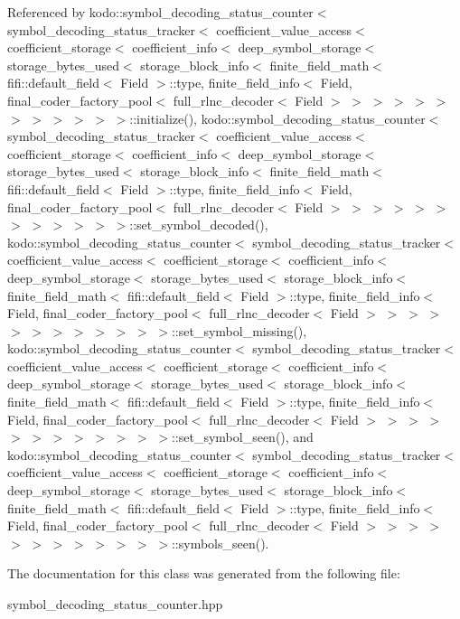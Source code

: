 Referenced by kodo\-::symbol\-\_\-decoding\-\_\-status\-\_\-counter$<$ symbol\-\_\-decoding\-\_\-status\-\_\-tracker$<$ coefficient\-\_\-value\-\_\-access$<$ coefficient\-\_\-storage$<$ coefficient\-\_\-info$<$ deep\-\_\-symbol\-\_\-storage$<$ storage\-\_\-bytes\-\_\-used$<$ storage\-\_\-block\-\_\-info$<$ finite\-\_\-field\-\_\-math$<$ fifi\-::default\-\_\-field$<$ Field $>$\-::type, finite\-\_\-field\-\_\-info$<$ Field, final\-\_\-coder\-\_\-factory\-\_\-pool$<$ full\-\_\-rlnc\-\_\-decoder$<$ Field $>$ $>$ $>$ $>$ $>$ $>$ $>$ $>$ $>$ $>$ $>$ $>$\-::initialize(), kodo\-::symbol\-\_\-decoding\-\_\-status\-\_\-counter$<$ symbol\-\_\-decoding\-\_\-status\-\_\-tracker$<$ coefficient\-\_\-value\-\_\-access$<$ coefficient\-\_\-storage$<$ coefficient\-\_\-info$<$ deep\-\_\-symbol\-\_\-storage$<$ storage\-\_\-bytes\-\_\-used$<$ storage\-\_\-block\-\_\-info$<$ finite\-\_\-field\-\_\-math$<$ fifi\-::default\-\_\-field$<$ Field $>$\-::type, finite\-\_\-field\-\_\-info$<$ Field, final\-\_\-coder\-\_\-factory\-\_\-pool$<$ full\-\_\-rlnc\-\_\-decoder$<$ Field $>$ $>$ $>$ $>$ $>$ $>$ $>$ $>$ $>$ $>$ $>$ $>$\-::set\-\_\-symbol\-\_\-decoded(), kodo\-::symbol\-\_\-decoding\-\_\-status\-\_\-counter$<$ symbol\-\_\-decoding\-\_\-status\-\_\-tracker$<$ coefficient\-\_\-value\-\_\-access$<$ coefficient\-\_\-storage$<$ coefficient\-\_\-info$<$ deep\-\_\-symbol\-\_\-storage$<$ storage\-\_\-bytes\-\_\-used$<$ storage\-\_\-block\-\_\-info$<$ finite\-\_\-field\-\_\-math$<$ fifi\-::default\-\_\-field$<$ Field $>$\-::type, finite\-\_\-field\-\_\-info$<$ Field, final\-\_\-coder\-\_\-factory\-\_\-pool$<$ full\-\_\-rlnc\-\_\-decoder$<$ Field $>$ $>$ $>$ $>$ $>$ $>$ $>$ $>$ $>$ $>$ $>$ $>$\-::set\-\_\-symbol\-\_\-missing(), kodo\-::symbol\-\_\-decoding\-\_\-status\-\_\-counter$<$ symbol\-\_\-decoding\-\_\-status\-\_\-tracker$<$ coefficient\-\_\-value\-\_\-access$<$ coefficient\-\_\-storage$<$ coefficient\-\_\-info$<$ deep\-\_\-symbol\-\_\-storage$<$ storage\-\_\-bytes\-\_\-used$<$ storage\-\_\-block\-\_\-info$<$ finite\-\_\-field\-\_\-math$<$ fifi\-::default\-\_\-field$<$ Field $>$\-::type, finite\-\_\-field\-\_\-info$<$ Field, final\-\_\-coder\-\_\-factory\-\_\-pool$<$ full\-\_\-rlnc\-\_\-decoder$<$ Field $>$ $>$ $>$ $>$ $>$ $>$ $>$ $>$ $>$ $>$ $>$ $>$\-::set\-\_\-symbol\-\_\-seen(), and kodo\-::symbol\-\_\-decoding\-\_\-status\-\_\-counter$<$ symbol\-\_\-decoding\-\_\-status\-\_\-tracker$<$ coefficient\-\_\-value\-\_\-access$<$ coefficient\-\_\-storage$<$ coefficient\-\_\-info$<$ deep\-\_\-symbol\-\_\-storage$<$ storage\-\_\-bytes\-\_\-used$<$ storage\-\_\-block\-\_\-info$<$ finite\-\_\-field\-\_\-math$<$ fifi\-::default\-\_\-field$<$ Field $>$\-::type, finite\-\_\-field\-\_\-info$<$ Field, final\-\_\-coder\-\_\-factory\-\_\-pool$<$ full\-\_\-rlnc\-\_\-decoder$<$ Field $>$ $>$ $>$ $>$ $>$ $>$ $>$ $>$ $>$ $>$ $>$ $>$\-::symbols\-\_\-seen().



The documentation for this class was generated from the following file\-:\begin{DoxyCompactItemize}
\item 
symbol\-\_\-decoding\-\_\-status\-\_\-counter.\-hpp\end{DoxyCompactItemize}
